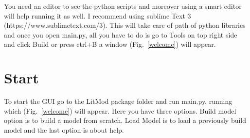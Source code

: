 \documentclass[12pt]{article}
\begin{document}
You need an editor to see the python scripts and moreover using a smart editor will help running it as well. I recommend using sublime Text 3 (https://www.sublimetext.com/3). This will take care of path of python libraries and once you open main.py, all you have to do is go to Tools on top right side and click Build or press ctrl+B a window (Fig.~\ref{welcome}) will appear.

\section{Start}
To start the GUI go to the LitMod package folder and run main.py, running which  (Fig.~\ref{welcome}) will appear. Here you have three options. Build model option is to build a model from scratch. Load Model is to load a previously build model and the last option is about help.\\
\end{document}
